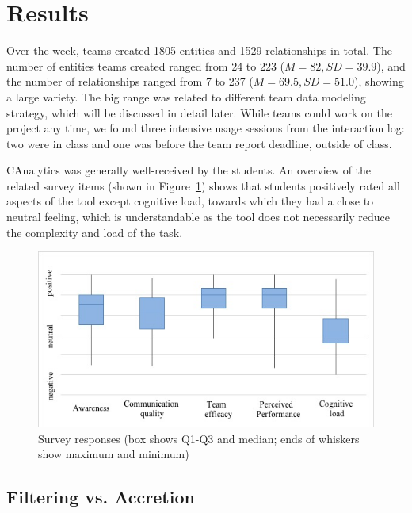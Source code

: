 \section{Results}\label{study1-results}

Over the week, teams created 1805 entities and 1529 relationships in
total. The number of entities teams created ranged from 24 to 223 ($M=82,
SD=39.9$), and the number of relationships ranged from 7 to 237 ($M=69.5,
SD=51.0$), showing a large variety. The big range was related to different team data modeling strategy,
which will be discussed in detail later. While teams could work on the project any time, we found three intensive usage sessions from the interaction log: two were in class and one was before the team report deadline, outside of class.

CAnalytics was generally well-received by the students. An overview of
the related survey items (shown in Figure~\ref{fig:survey}) shows that students positively rated all aspects
of the tool except cognitive load, towards which they had a close to neutral feeling, which is understandable as the tool does not necessarily reduce the complexity and load of the task.  %

\begin{figure}
\centering
\includegraphics[width=\linewidth]{04-Study_one/img/survey_boxchart.jpg}
\caption{Survey responses (box shows Q1-Q3 and median; ends of whiskers show
maximum and minimum)\label{fig:survey}}
\end{figure}

\subsection{Filtering vs. Accretion}


